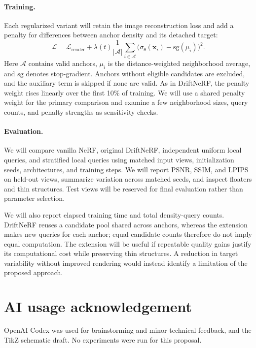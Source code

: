 \documentclass[sigconf,nonacm]{acmart}
\begin{document}
\paragraph{Training.}
Each regularized variant will retain the image reconstruction loss and add a penalty for differences between anchor density and its detached target:
\begin{equation}
\mathcal{L}=\mathcal{L}_{\mathrm{render}}
+\lambda(t)\frac{1}{|\mathcal{A}|}
\sum_{i\in\mathcal{A}}
\bigl(\sigma_{\theta}(\mathbf{x}_i)-\mathrm{sg}(\mu_i)\bigr)^2.
\end{equation}
Here $\mathcal{A}$ contains valid anchors, $\mu_i$ is the distance-weighted neighborhood average, and $\mathrm{sg}$ denotes stop-gradient. Anchors without eligible candidates are excluded, and the auxiliary term is skipped if none are valid. As in DriftNeRF, the penalty weight rises linearly over the first 10\% of training. We will use a shared penalty weight for the primary comparison and examine a few neighborhood sizes, query counts, and penalty strengths as sensitivity checks.

\paragraph{Evaluation.}
We will compare vanilla NeRF, original DriftNeRF, independent uniform local queries, and stratified local queries using matched input views, initialization seeds, architectures, and training steps. We will report PSNR, SSIM, and LPIPS on held-out views, summarize variation across matched seeds, and inspect floaters and thin structures. Test views will be reserved for final evaluation rather than parameter selection.

We will also report elapsed training time and total density-query counts. DriftNeRF reuses a candidate pool shared across anchors, whereas the extension makes new queries for each anchor; equal candidate counts therefore do not imply equal computation. The extension will be useful if repeatable quality gains justify its computational cost while preserving thin structures. A reduction in target variability without improved rendering would instead identify a limitation of the proposed approach.

\section*{AI usage acknowledgement}\label{sec:ai}
OpenAI Codex was used for brainstorming and minor technical feedback, and the TikZ schematic draft. No experiments were run for this proposal.



\end{document}
